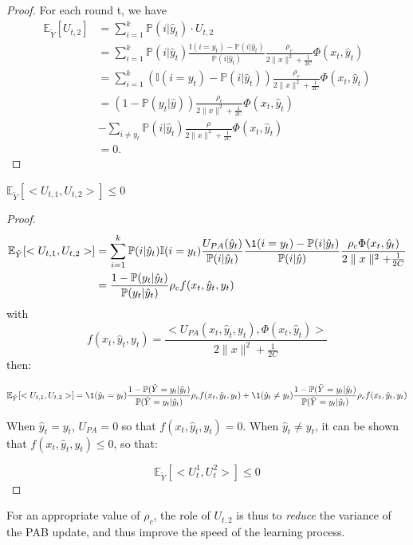 \begin{proof}
For each round t, we have
\[
\begin{split}
\mathbb{E}_{\tilde{Y}}[U_{t,2}] &= \sum_{i=1}^{k} \mathbb{P}(i|\hat{y}_t)\cdot U_{t,2} \\
&= \sum_{i=1}^{k}\mathbb{P}(i|\hat{y}_t)\frac{\mathbb{I}(i=y_t)-\mathbb{P}(i|\hat{y}_t)}{\mathbb{P}(i|\hat{y}_t)}\frac{\rho_c}{2\parallel{x}\parallel^2+\frac{1}{2C}}\Phi(x_t,\hat{y}_t)\\
&= \sum_{i=1}^{k}(\mathbb{I}(i=y_t)-\mathbb{P}(i|\hat{y}_t))\frac{\rho_c}{2\parallel{x}\parallel^2+\frac{1}{2C}}\Phi(x_t,\hat{y}_t) \\
&= (1-\mathbb{P}(y_t|\hat{y}))\frac{\rho_c}{2\parallel{x}\parallel^2+\frac{1}{2C}}\Phi(x_t,\hat{y}_t)\\
&-\underset{i\neq y_t}{\sum} \mathbb{P}(i|\hat{y}_t)\frac{\rho}{2\parallel{x}\parallel^2+\frac{1}{2C}}\Phi(x_t,\hat{y}_t)\\
& =0.
\end{split}
\]
\end{proof}
\begin{lema}
\label{lema:pab3}
$\mathbb{E}_{\tilde{Y}}[<U_{t,1},U_{t,2}>]  \leq 0$
\end{lema}
\begin{proof}
\[
\begin{split}
\mathbb{E}_{\tilde{Y}}[<U_{t,1},U_{t,2}>]  
&= \sum_{i=1}^{k} \mathbb{P}(i|\hat{y}_t)\mathbb{I}(i=y_t)\frac{U_{PA}(\hat{y}_t)}{\mathbb{P}(i|\hat{y}_t)} \frac{\1(i=y_t)-\mathbb{P}(i|\hat{y}_t)}{\mathbb{P}(i|\hat{y})}\frac{\rho_c \Phi(x_t,\hat{y}_t)}{2\parallel{x}\parallel^2+\frac{1}{2C}} \\
&= \frac{1-\mathbb{P}(y_t|\hat{y}_t)}{\mathbb{P}(y_t|\hat{y}_t)}\rho_c f(x_t, \hat{y}_t,y_t)
\end{split}
\]
with
\[f(x_t,\hat{y}_t,y_t) = \frac{<U_{PA}(x_t,\hat{y}_t,y_t),\Phi(x_t,\hat{y}_t)>}{2\parallel{x}\parallel^2+\frac{1}{2C}}\]
then:

\[\mathbb{E}_{\tilde{Y}}[<U_{t,1},U_{t,2}>] = \1(\hat{y}_t=y_t) \frac{1-\mathbb{P}(\tilde{Y}=y_t|\hat{y}_t)}{\mathbb{P}(\tilde{Y}=y_t|\hat{y}_t)}\rho_cf(x_t,\hat{y}_t,y_t)+ \1(\hat{y}_t \neq y_t) \frac{1-\mathbb{P}(\tilde{Y}=y_t|\hat{y}_t)}{\mathbb{P}(\tilde{Y}=y_t|\hat{y}_t)}\rho_cf(x_t,\hat{y}_t,y_t)\]

When $\hat{y}_t = y_t $, $U_{PA} = 0$ so that $f(x_t,\hat{y}_t,y_t)=0$.  When $\hat{y}_t \neq y_t $, it can be shown  that $f(x_t,\hat{y}_t,y_t)\leq 0$, so that:

\[
\mathbb{E}_{\tilde{Y}}[<U_t^1,U_t^2>] \leq 0
\]
\end{proof}
For an appropriate value of $\rho_c$, the role of $U_{t,2}$ is thus  to \emph{reduce} the variance of the PAB update,
and thus improve the speed of the learning process.


